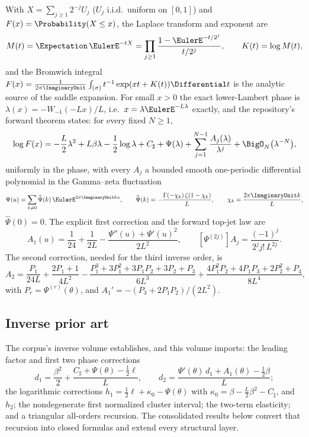 \documentclass[11pt,oneside]{article}
\numberwithin{equation}{section}
\theoremstyle{definition}
\theoremstyle{remark}
\newcommand{\LambertW}{W}
\newcommand{\Psihat}{\widehat\Psi}
\newcommand{\Csharp}{C_{\sharp}}
\begin{document}
With $X=\sum_{j\ge1}2^{-j}U_j$ ($U_j$ i.i.d.\ uniform on $[0,1]$) and
$F(x)=\Probability(X\le x)$, the Laplace transform and exponent are
\begin{equation}
 M(t)=\Expectation\,\EulerE^{-tX}
 =\prod_{j\ge1}\frac{1-\EulerE^{-t/2^{j}}}{t/2^{j}},
 \qquad
 K(t)=\log M(t),
 \label{eq:K-def}
\end{equation}
and the Bromwich integral
$F(x)=\frac1{2\pi\ImaginaryUnit}\int_{(\sigma)}t^{-1}\exp(xt+K(t))\Differential t$ is the
analytic source of the saddle expansion.  For small $x>0$ the exact
lower-Lambert phase is
$\lambda(x)=-\LambertW_{-1}(-Lx)/L$, i.e.\
$x=\lambda\EulerE^{-L\lambda}$ exactly, and the repository's forward
theorem states: for every fixed $N\ge1$,
\begin{equation}
 \log F(x)=
 -\frac L2\lambda^{2}+L\beta\lambda-\frac12\log\lambda
 +\Csharp+\Psi(\lambda)
 +\sum_{j=1}^{N-1}\frac{A_j(\lambda)}{\lambda^{j}}
 +\BigO_N\bigl(\lambda^{-N}\bigr),
 \label{eq:forward-all-orders}
\end{equation}
uniformly in the phase, with every $A_j$ a bounded smooth one-periodic
differential polynomial in the Gamma--zeta fluctuation
\begin{equation}
 \Psi(u)=\sum_{k\ne0}\Psihat(k)\,\EulerE^{2\pi\ImaginaryUnit ku},
 \qquad
 \Psihat(k)=-\frac{\Gamma(-\chi_k)\,\zeta(1-\chi_k)}{L},
 \qquad
 \chi_k=\frac{2\pi\ImaginaryUnit k}{L},
 \label{eq:Psi-Fourier}
\end{equation}
$\Psihat(0)=0$.  The explicit first correction and the forward
top-jet law are
\begin{equation}
 A_1(u)=\frac1{24}+\frac1{2L}
 -\frac{\Psi''(u)+\Psi'(u)^{2}}{2L^{2}},
 \qquad
 [\Psi^{(2j)}]A_j=\frac{(-1)^{j}}{2^{j}j!\,L^{2j}}.
 \label{eq:A1-and-topjet}
\end{equation}
The second correction, needed for the third inverse order, is
\begin{equation}
 A_2=\frac{P_1}{24L}+\frac{2P_1+1}{4L^{2}}
 -\frac{P_1^{3}+3P_1^{2}+3P_1P_2+3P_2+P_3}{6L^{3}}
 +\frac{4P_1^{2}P_2+4P_1P_3+2P_2^{2}+P_4}{8L^{4}},
 \label{eq:A2}
\end{equation}
with $P_r=\Psi^{(r)}(\theta)$, and
$A_1'=-(P_3+2P_1P_2)/(2L^{2})$.

\subsection{Inverse prior art}

The corpus's inverse volume establishes, and this volume imports: the
leading factor and first two phase corrections
\begin{equation}
 d_1=\frac{\beta^{2}}2
 +\frac{\Csharp+\Psi(\theta)-\tfrac12\ell}{L},
 \qquad
 d_2=\frac{\Psi'(\theta)\,d_1+A_1(\theta)-\tfrac12\beta}{L};
 \label{eq:d1-d2}
\end{equation}
the logarithmic corrections
$h_1=\tfrac12\ell+\kappa_0-\Psi(\theta)$ with
$\kappa_0=\beta-\tfrac L2\beta^{2}-\Csharp$, and $h_2$; the
nondegenerate first normalized cluster interval; the two-term
elasticity; and a triangular all-orders recursion.  The consolidated
results below convert that recursion into closed formulas and extend
every structural layer.
\end{document}
